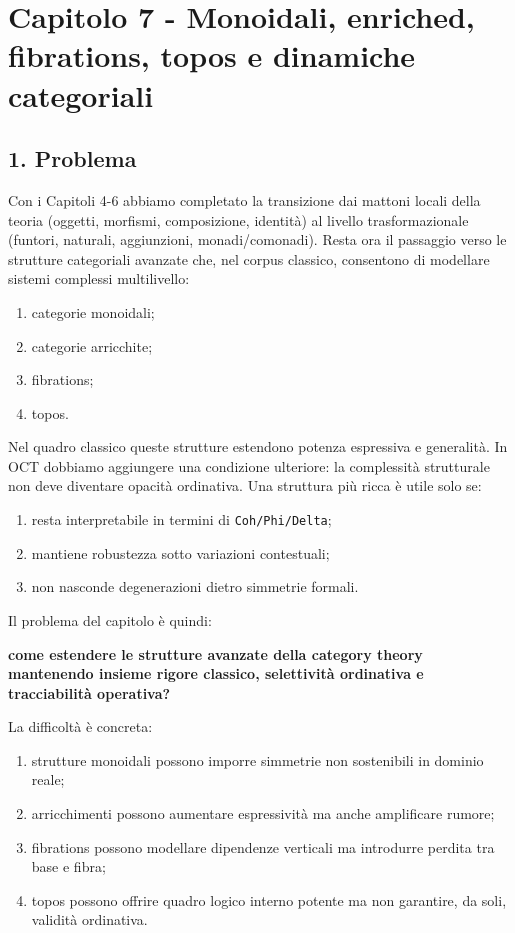 \chapter{Capitolo 7 - Monoidali, enriched, fibrations, topos e dinamiche categoriali}

\section{1. Problema}

Con i Capitoli 4-6 abbiamo completato la transizione dai mattoni locali della teoria (oggetti, morfismi, composizione, identità) al livello trasformazionale (funtori, naturali, aggiunzioni, monadi/comonadi). Resta ora il passaggio verso le strutture categoriali avanzate che, nel corpus classico, consentono di modellare sistemi complessi multilivello:

\begin{enumerate}
\def\labelenumi{\arabic{enumi}.}
\tightlist
\item
  categorie monoidali;
\item
  categorie arricchite;
\item
  fibrations;
\item
  topos.
\end{enumerate}

Nel quadro classico queste strutture estendono potenza espressiva e generalità. In OCT dobbiamo aggiungere una condizione ulteriore: la complessità strutturale non deve diventare opacità ordinativa. Una struttura più ricca è utile solo se:

\begin{enumerate}
\def\labelenumi{\arabic{enumi}.}
\tightlist
\item
  resta interpretabile in termini di \texttt{Coh/Phi/Delta};
\item
  mantiene robustezza sotto variazioni contestuali;
\item
  non nasconde degenerazioni dietro simmetrie formali.
\end{enumerate}

Il problema del capitolo è quindi:

\textbf{come estendere le strutture avanzate della category theory mantenendo insieme rigore classico, selettività ordinativa e tracciabilità operativa?}

La difficoltà è concreta:

\begin{enumerate}
\def\labelenumi{\arabic{enumi}.}
\tightlist
\item
  strutture monoidali possono imporre simmetrie non sostenibili in dominio reale;
\item
  arricchimenti possono aumentare espressività ma anche amplificare rumore;
\item
  fibrations possono modellare dipendenze verticali ma introdurre perdita tra base e fibra;
\item
  topos possono offrire quadro logico interno potente ma non garantire, da soli, validità ordinativa.
\end{enumerate}

